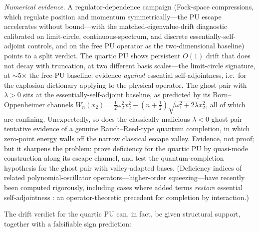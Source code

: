 \documentclass[11pt]{article}
\theoremstyle{definition}
\theoremstyle{remark}
\begin{document}
\emph{Numerical evidence.} A regulator-dependence campaign (Fock-space
compressions, which regulate position and momentum symmetrically---the PU
escape accelerates without bound---with the matched-eigenvalue-drift
diagnostic calibrated on limit-circle, continuous-spectrum, and discrete
essentially-self-adjoint controls, and on the free PU operator as the
two-dimensional baseline) points to a split verdict. The quartic PU shows
persistent $O(1)$ drift that does not decay with truncation, at two
different basis scales---the limit-circle signature, at $\sim$5$\times$
the free-PU baseline: evidence \emph{against} essential self-adjointness,
i.e.\ for the explosion dictionary applying to the physical operator. The
ghost pair with $\lambda>0$ sits at the essentially-self-adjoint baseline,
as predicted by its Born--Oppenheimer channels
$W_n(x_2)=\tfrac12\omega_2^{2}x_2^{2}-(n+\tfrac12)
\sqrt{\omega_1^{2}+2\lambda x_2^{2}}$, all of which are confining.
Unexpectedly, so does the classically malicious $\lambda<0$ ghost
pair---tentative evidence of a genuine Rauch--Reed-type quantum
completion, in which zero-point energy walls off the narrow classical
escape valley. Evidence, not proof; but it sharpens the problem: prove
deficiency for the quartic PU by quasi-mode construction along its escape
channel, and test the quantum-completion hypothesis for the ghost pair
with valley-adapted bases. (Deficiency indices of related
polynomial-oscillator operators---higher-order squeezing---have recently
been computed rigorously, including cases where added terms
\emph{restore} essential self-adjointness \cite{FischerBL2026}: an
operator-theoretic precedent for completion by interaction.)

The drift verdict for the quartic PU can, in fact, be given structural
support, together with a falsifiable sign prediction:
\end{document}
